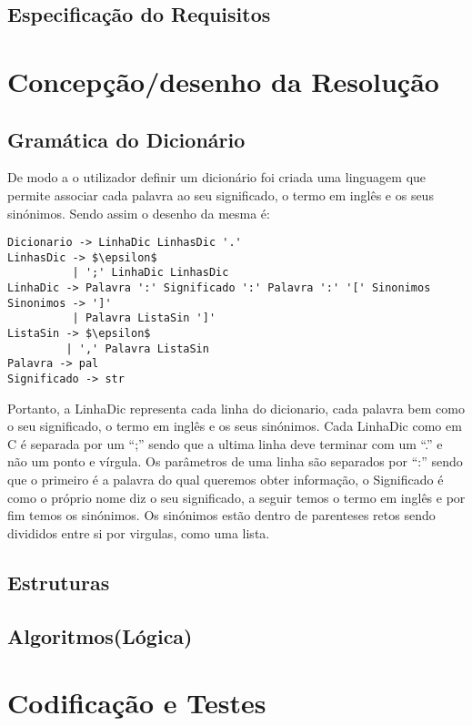 \documentclass{llncs}
\begin{document}
\subsection{Especificação do Requisitos}

\section{Concepção/desenho da Resolução}

\subsection{Gramática do Dicionário}
De modo a o utilizador definir um dicionário foi criada uma linguagem que permite associar cada palavra ao seu significado, o termo em inglês e os seus sinónimos. Sendo assim o desenho da mesma é:
\begin{lstlisting}[mathescape]
Dicionario -> LinhaDic LinhasDic '.' 
LinhasDic -> $\epsilon$ 
          | ';' LinhaDic LinhasDic 
LinhaDic -> Palavra ':' Significado ':' Palavra ':' '[' Sinonimos 
Sinonimos -> ']' 
          | Palavra ListaSin ']' 
ListaSin -> $\epsilon$ 
         | ',' Palavra ListaSin 
Palavra -> pal 
Significado -> str 
\end{lstlisting}
Portanto, a LinhaDic representa cada linha do dicionario, cada palavra bem como o seu significado, o termo em inglês e os seus sinónimos. Cada LinhaDic como em C é separada por um ``;'' sendo que a ultima linha deve terminar com um ``.'' e não um ponto e vírgula. Os parâmetros de uma linha são separados por ``:'' sendo que o primeiro é a palavra do qual queremos obter informação, o Significado é como o próprio nome diz o seu significado, a seguir temos o termo em inglês e por fim temos os sinónimos. Os sinónimos estão dentro de parenteses retos sendo divididos entre si por virgulas, como uma lista.

\subsection{Estruturas}

\subsection{Algoritmos(Lógica)}

\section{Codificação e Testes}
\end{document}

